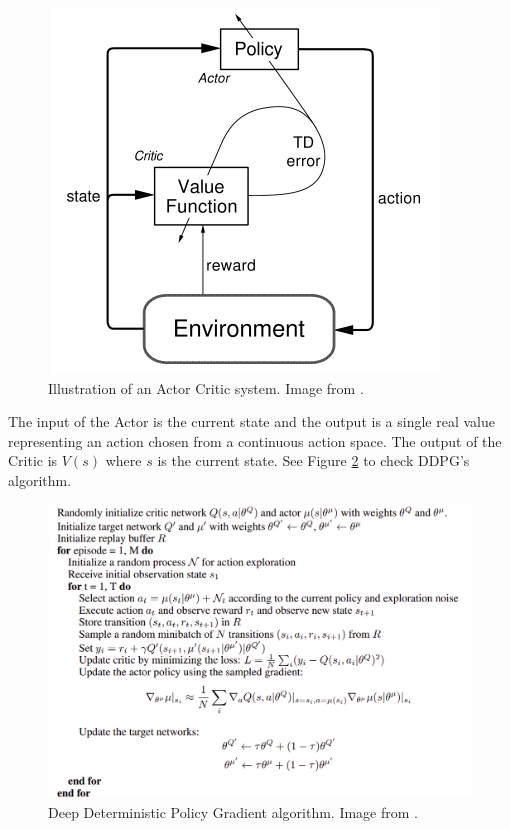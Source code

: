\begin{figure}[H]
    \centering
    \includegraphics[scale=0.5]{images/AC_example.png}
    \caption{Illustration of an Actor Critic system. Image from \cite{rlsutton}.}
    \label{fig:acex}
\end{figure}

The input of the Actor is the current state and the output is a single real value representing an action chosen from a continuous action space. The output of the Critic is $V(s)$ where $s$ is the current state. See Figure \ref{fig:ddpgalg} to check DDPG's algorithm.


\begin{figure}[H]
    \centering
    \includegraphics[scale=0.3]{images/ddpgalg.png}
    \caption{Deep Deterministic Policy Gradient algorithm. Image from \cite{DDPG}.}
    \label{fig:ddpgalg}
\end{figure}
